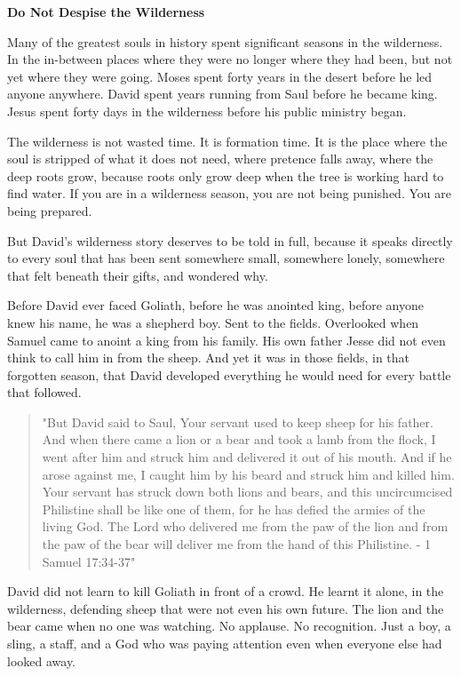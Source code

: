 \textbf{Do Not Despise the Wilderness}

Many of the greatest souls in history spent significant seasons in the
wilderness. In the in-between places where they were no longer where
they had been, but not yet where they were going. Moses spent forty
years in the desert before he led anyone anywhere. David spent years
running from Saul before he became king. Jesus spent forty days in the
wilderness before his public ministry began.

The wilderness is not wasted time. It is formation time. It is the place
where the soul is stripped of what it does not need, where pretence
falls away, where the deep roots grow, because roots only grow deep when
the tree is working hard to find water. If you are in a wilderness
season, you are not being punished. You are being prepared.

But David's wilderness story deserves to be told in full, because it
speaks directly to every soul that has been sent somewhere small,
somewhere lonely, somewhere that felt beneath their gifts, and wondered
why.

Before David ever faced Goliath, before he was anointed king, before
anyone knew his name, he was a shepherd boy. Sent to the fields.
Overlooked when Samuel came to anoint a king from his family. His own
father Jesse did not even think to call him in from the sheep. And yet
it was in those fields, in that forgotten season, that David developed
everything he would need for every battle that followed.

\begin{quote}
"But David said to Saul, Your servant used to keep sheep for his father.
And when there came a lion or a bear and took a lamb from the flock, I
went after him and struck him and delivered it out of his mouth. And if
he arose against me, I caught him by his beard and struck him and killed
him. Your servant has struck down both lions and bears, and this
uncircumcised Philistine shall be like one of them, for he has defied
the armies of the living God. The Lord who delivered me from the paw of
the lion and from the paw of the bear will deliver me from the hand of
this Philistine. - 1 Samuel 17:34-37"
\end{quote}

David did not learn to kill Goliath in front of a crowd. He learnt it
alone, in the wilderness, defending sheep that were not even his own
future. The lion and the bear came when no one was watching. No
applause. No recognition. Just a boy, a sling, a staff, and a God who
was paying attention even when everyone else had looked away.

